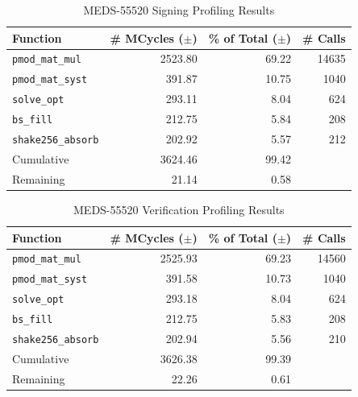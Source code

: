 \documentclass[11pt,a4paper]{report}
\theoremstyle{definition}
\begin{document}
\begin{table}[]
  \centering
  \begin{tabular}{lrrr}
    \toprule
    \textbf{Function} & \textbf{\# MCycles} ($\pm$) & \textbf{\% of Total} ($\pm$) & \textbf{\# Calls} \\
    \midrule
      \texttt{pmod\_mat\_mul} & 2523.80 & 69.22 & 14635 \\
      \texttt{pmod\_mat\_syst} & 391.87 & 10.75 & 1040 \\
      \texttt{solve\_opt} & 293.11 & 8.04 & 624 \\
      \texttt{bs\_fill} & 212.75 & 5.84 & 208 \\
      \texttt{shake256\_absorb} & 202.92 & 5.57 & 212 \\
    \midrule
      Cumulative & 3624.46 & 99.42 & \\
      Remaining & 21.14 & 0.58 & \\
    \bottomrule
  \end{tabular}
  \caption{MEDS-55520 Signing Profiling Results}
  \label{tab:medssigningfunctions}
\end{table}

\begin{table}[]
  \centering
  \begin{tabular}{lrrr}
    \toprule
    \textbf{Function} & \textbf{\# MCycles} ($\pm$) & \textbf{\% of Total} ($\pm$) & \textbf{\# Calls} \\
    \midrule
      \texttt{pmod\_mat\_mul} & 2525.93 & 69.23 & 14560 \\
      \texttt{pmod\_mat\_syst} & 391.58 & 10.73 & 1040 \\
      \texttt{solve\_opt} & 293.18 & 8.04 & 624 \\
      \texttt{bs\_fill} & 212.75 & 5.83 & 208 \\
      \texttt{shake256\_absorb} & 202.94 & 5.56 & 210 \\
    \midrule
      Cumulative & 3626.38 & 99.39 & \\
      Remaining & 22.26 & 0.61 & \\
    \bottomrule
  \end{tabular}
  \caption{MEDS-55520 Verification Profiling Results}
  \label{tab:medsverificationfunctions}
\end{table}

\end{document}
